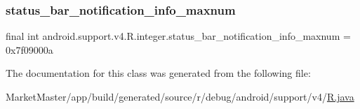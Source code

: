 \subsubsection{\texorpdfstring{status\+\_\+bar\+\_\+notification\+\_\+info\+\_\+maxnum}{status\_bar\_notification\_info\_maxnum}}
{\footnotesize\ttfamily final int android.\+support.\+v4.\+R.\+integer.\+status\+\_\+bar\+\_\+notification\+\_\+info\+\_\+maxnum = 0x7f09000a\hspace{0.3cm}{\ttfamily [static]}}



The documentation for this class was generated from the following file\+:\begin{DoxyCompactItemize}
\item 
Market\+Master/app/build/generated/source/r/debug/android/support/v4/\mbox{\hyperlink{debug_2android_2support_2v4_2R_8java}{R.\+java}}\end{DoxyCompactItemize}
